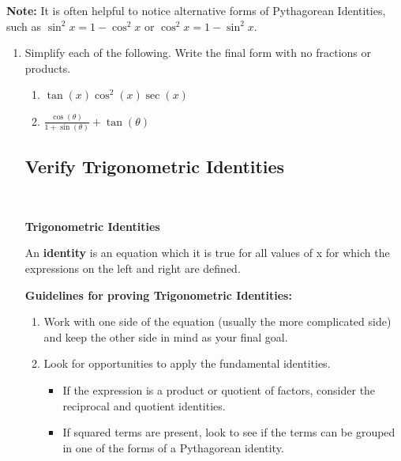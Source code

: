 {\bf Note:} It is often helpful to notice alternative forms of Pythagorean Identities, such as $\sin^2 x = 1-\cos^2 x$ or $\cos^2 x = 1-\sin^2 x$.




\begin{enumerate}
\vspace{-.1in}
\item Simplify each of the following. Write the final form with no fractions or products.

\begin{enumerate}
\item $\tan(x) \cos^2(x) \sec(x)$
\vfill


\newpage

\item $\displaystyle \frac{\cos (\theta)}{1+\sin (\theta)}+\tan (\theta)$
\vfill


\end{enumerate}

\subsection{Verify Trigonometric Identities} ~

\begin{boxthm}
{\bf Trigonometric Identities}

An {\bf identity} is an equation which it is true for all values of x for which the expressions on the left and right are defined.

\vspace{0.5cm}

{\bf Guidelines for proving Trigonometric Identities:}
\begin{enumerate}
\item Work with one side of the equation (usually the more complicated side) and keep the other side in mind as your final goal.

\item Look for opportunities to apply the fundamental identities.

\begin{itemize}

\item If the expression is a product or quotient of factors, consider the reciprocal and quotient identities.

\item If squared terms are present, look to see if the terms can be grouped in one of the forms of a Pythagorean identity.


\end{itemize}
\end{enumerate}
\end{boxthm}
\end{enumerate}
